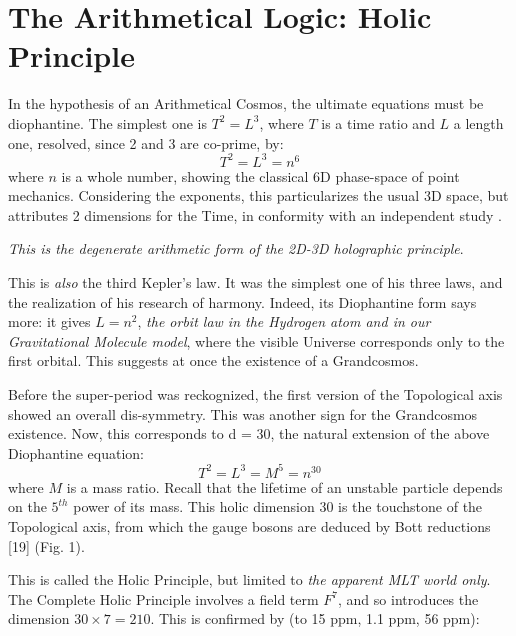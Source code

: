 \documentclass[twoside,draft]{article}
\begin{document}
\begin{sloppypar}
\section{The Arithmetical Logic: Holic Principle}

In the hypothesis of an Arithmetical Cosmos, the ultimate equations must be diophantine. The
simplest one is $T^{2} = L^{3}$, where $T$ is a time ratio and $L$ a length one, resolved, since 2 and 3 are 
co-prime, by:
\begin{equation}
T^{2} = L^{3} = n^{6}
\end{equation}
where $n$ is a whole number, showing the classical 6D phase-space of point mechanics. Considering the exponents, this particularizes the usual 3D space, but attributes 2 dimensions for the Time, in conformity with an independent study \cite{Bars}.

\textit{This is the degenerate arithmetic form of the 2D-3D holographic principle}.

This is \textit{also} the third Kepler's law. It was the simplest one of his three laws, and the realization of his research of harmony. Indeed, its Diophantine form says more: it gives $L = n^{2}$, \textit{the orbit law in the Hydrogen atom and in our Gravitational Molecule model}, where the visible Universe corresponds only to the first orbital. This suggests at once the existence of a Grandcosmos. 

Before the super-period was reckognized, the first version of the Topological axis \cite{Sanchez1} showed an overall dis-symmetry. This was another sign for the Grandcosmos existence.   Now, this corresponds to d = 30, the natural extension of the above Diophantine equation:
\begin{equation}
T^{2} = L^{3} = M^{5} = n^{30}
\end{equation}
where $M$ is a mass ratio. Recall that the lifetime of an unstable particle depends on the $5^{th}$ power of its mass. This holic dimension 30 is the touchstone of the Topological axis, from which the gauge bosons are deduced by Bott reductions [19] (Fig. 1).

This is called the Holic Principle, but limited to \textit{the apparent MLT world only}. The Complete Holic
Principle \cite{Sanchez4} involves a field term $F^{7}$, and so introduces the dimension $30 \times 7 = 210$. This is confirmed by (to 15 ppm, 1.1 ppm, 56 ppm):


\end{sloppypar}
\end{document}
